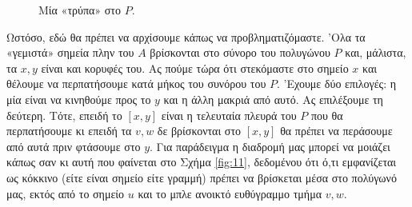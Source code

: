 \documentclass[11pt,a4paper]{article}
\theoremstyle{definition}
\begin{document}
	\begin{figure}[!htb]
		\centering
		\caption{Μία «τρύπα» στο $P$.}
		\label{fig:10}
	\end{figure}

	Ωστόσο, εδώ θα πρέπει να αρχίσουμε κάπως να προβληματιζόμαστε. 'Ολα τα «γεμιστά» σημεία πλην του $A$ βρίσκονται στο σύνορο του πολυγώνου $P$ και, μάλιστα, τα $x,y$ είναι και κορυφές του. Ας πούμε τώρα ότι στεκόμαστε στο σημείο $x$ και θέλουμε να περπατήσουμε κατά μήκος του συνόρου του $P$. 'Εχουμε δύο επιλογές: η μία είναι να κινηθούμε προς το $y$ και η άλλη μακριά από αυτό. Ας επιλέξουμε τη δεύτερη. Τότε, επειδή το $[x,y]$ είναι η τελευταία πλευρά του $P$ που θα περπατήσουμε κι επειδή τα $v,w$ δε βρίσκονται στο $[x,y]$ θα πρέπει να περάσουμε από αυτά πριν φτάσουμε στο $y$. Για παράδειγμα η διαδρομή μας μπορεί να μοιάζει κάπως σαν κι αυτή που φαίνεται στο Σχήμα \ref{fig:11}, δεδομένου ότι ό,τι εμφανίζεται ως κόκκινο (είτε είναι σημείο είτε γραμμή) πρέπει να βρίσκεται μέσα στο πολύγωνό μας, εκτός από το σημείο $u$ και το μπλε ανοικτό ευθύγραμμο τμήμα $v,w$.
	
\end{document}
